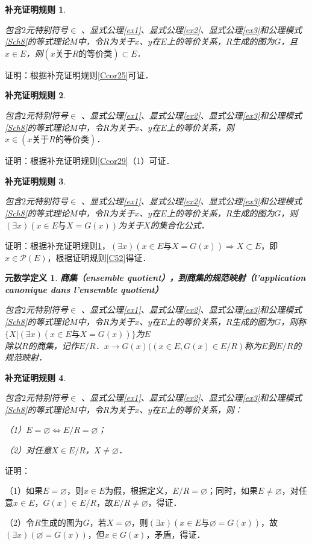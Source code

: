 \documentclass[12pt, a4paper, oneside]{book}
\newtheorem{metadef}{元数学定义}
\newtheorem{Ccor}{补充证明规则}
\begin{document}
			\begin{Ccor}\label{Ccor31}
				\hfill\par
				包含$2$元特别符号$\in$ 、显式公理\ref{ex1}、显式公理\ref{ex2}、显式公理\ref{ex3}和公理模式\ref{Sch8}的等式理论$M$中，令$R$为关于$x$、$y$在$E$上的等价关系，$R$生成的图为$G$，且$x\in E$，则$(x\text{关于}R\text{的等价类})\subset E$．
			\end{Ccor}
			证明：根据补充证明规则\ref{Ccor25}可证．

			\begin{Ccor}\label{Ccor32}
				\hfill\par
				包含$2$元特别符号$\in$ 、显式公理\ref{ex1}、显式公理\ref{ex2}、显式公理\ref{ex3}和公理模式\ref{Sch8}的等式理论$M$中，令$R$为关于$x$、$y$在$E$上的等价关系，则$x\in(x\text{关于}R\text{的等价类})$．
			\end{Ccor}
			证明：根据补充证明规则\ref{Ccor29}（1）可证．

			\begin{Ccor}\label{Ccor33}
				\hfill\par
				包含$2$元特别符号$\in$ 、显式公理\ref{ex1}、显式公理\ref{ex2}、显式公理\ref{ex3}和公理模式\ref{Sch8}的等式理论$M$中，令$R$为关于$x$、$y$在$E$上的等价关系，$R$生成的图为$G$，则$(\exists x)(x\in E\text{与}X=G(x))$为关于$X$的集合化公式．
			\end{Ccor}
			证明：根据补充证明规则\ref{Ccor31}，$(\exists x)(x\in E\text{与}X=G(x))\Rightarrow X\subset E$，即$x\in \mathcal{P}(E)$，根据证明规则\ref{C52}得证．

			\begin{metadef}
				\textbf{商集（ensemble quotient），到商集的规范映射（l'application canonique dans l'ensemble quotient）}
				\par
				包含$2$元特别符号$\in$ 、显式公理\ref{ex1}、显式公理\ref{ex2}、显式公理\ref{ex3}和公理模式\ref{Sch8}的等式理论$M$中，令$R$为关于$x$、$y$在$E$上的等价关系，$R$生成的图为$G$，则称$\{X|(\exists x)(x\in E\text{与}X=G(x))\}$为$E$\\除以$R$的商集，记作$E/R$．$x\to G(x)((x\in E, G(x)\in E/R)$称为$E$到$E/R$的规范映射．
			\end{metadef}

			\begin{Ccor}\label{Ccor34}
				\hfill\par
				包含$2$元特别符号$\in$ 、显式公理\ref{ex1}、显式公理\ref{ex2}、显式公理\ref{ex3}和公理模式\ref{Sch8}的等式理论$M$中，令$R$为关于$x$、$y$在$E$上的等价关系，则：
				\par
				（1）$E=\varnothing\Leftrightarrow E/R=\varnothing$；
				\par
				（2）对任意$X\in E/R$，$X\neq \varnothing$．
			\end{Ccor}
			证明：
			\par
			（1）如果$E=\varnothing$，则$x\in E$为假，根据定义，$E/R=\varnothing$；同时，如果$E\neq \varnothing$，对任意$x\in E$，$G(x)\in E/R$，故$E/R\neq \varnothing$，得证．
			\par
			（2）令$R$生成的图为$G$，若$X=\varnothing$，则$(\exists x)(x\in E\text{与}\varnothing=G(x))$，故$(\exists x)(\varnothing=G(x))$，但$x\in G(x)$，矛盾，得证．
\end{document}
